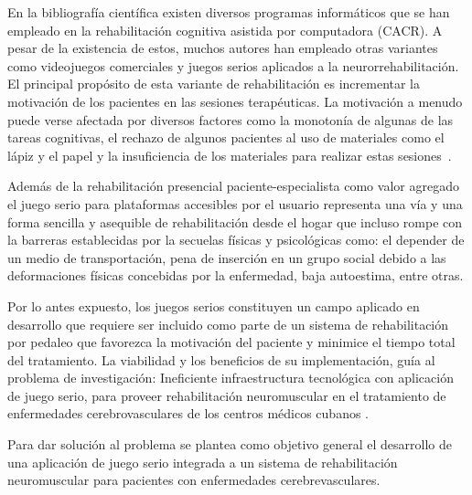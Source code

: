 \begin{introduction}
    \vspace{5pt}
    En la bibliografía científica existen diversos programas informáticos que se han empleado en la 
    rehabilitación cognitiva asistida por computadora (CACR). A pesar de la existencia de estos, muchos 
    autores han empleado otras variantes como videojuegos comerciales y juegos serios aplicados a la 
    neurorrehabilitación. El principal propósito de esta variante de rehabilitación es incrementar la 
    motivación de los pacientes en las sesiones terapéuticas. La motivación a menudo puede verse afectada 
    por diversos factores como la monotonía de algunas de las tareas cognitivas, el rechazo de algunos 
    pacientes al uso de materiales como el lápiz y el papel y la insuficiencia de los materiales para 
    realizar estas sesiones~\cite{regalon12019juegos}. 
    
    \vspace{5pt}
    Además de la rehabilitación presencial paciente-especialista como valor 
    agregado el juego serio para plataformas accesibles por el usuario representa una vía y una forma
    sencilla y asequible de rehabilitación desde el hogar que incluso rompe con la barreras establecidas 
    por la secuelas físicas y psicológicas como: el depender de un medio de transportación, pena de inserción 
    en un grupo social debido a las deformaciones físicas concebidas por la enfermedad, baja autoestima, 
    entre otras.
    
    \vspace{5pt}
    Por lo antes expuesto, los juegos serios constituyen un campo aplicado en desarrollo que requiere ser incluido 
    como parte de un sistema de rehabilitación por pedaleo que favorezca la motivación del paciente y minimice el tiempo total 
    del tratamiento. La viabilidad y los beneficios de su implementación, guía al problema de investigación: 
    Ineficiente infraestructura tecnológica con aplicación de juego serio, para proveer rehabilitación neuromuscular en el tratamiento de
    enfermedades cerebrovasculares de los centros médicos cubanos . 

    \vspace{5pt}
    Para dar solución al problema se plantea como objetivo general el desarrollo de una aplicación de juego serio integrada a un sistema de 
    rehabilitación neuromuscular para pacientes con enfermedades cerebrevasculares.
    

\end{introduction}
